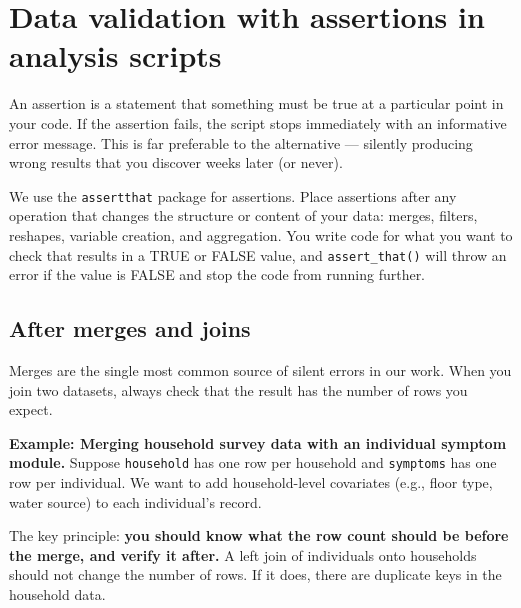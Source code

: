 \documentclass[
]{book}
\begin{document}
\section{Data validation with assertions in analysis scripts}\label{data-validation-with-assertions-in-analysis-scripts}

An assertion is a statement that something must be true at a particular point in your code. If the assertion fails, the script stops immediately with an informative error message. This is far preferable to the alternative --- silently producing wrong results that you discover weeks later (or never).

We use the \texttt{assertthat} package for assertions. Place assertions after any operation that changes the structure or content of your data: merges, filters, reshapes, variable creation, and aggregation. You write code for what you want to check that results in a TRUE or FALSE value, and \texttt{assert\_that()} will throw an error if the value is FALSE and stop the code from running further.

\subsection{After merges and joins}\label{after-merges-and-joins}

Merges are the single most common source of silent errors in our work. When you join two datasets, always check that the result has the number of rows you expect.

\textbf{Example: Merging household survey data with an individual symptom module.} Suppose \texttt{household} has one row per household and \texttt{symptoms} has one row per individual. We want to add household-level covariates (e.g., floor type, water source) to each individual's record.

The key principle: \textbf{you should know what the row count should be before the merge, and verify it after.} A left join of individuals onto households should not change the number of rows. If it does, there are duplicate keys in the household data.
\end{document}
